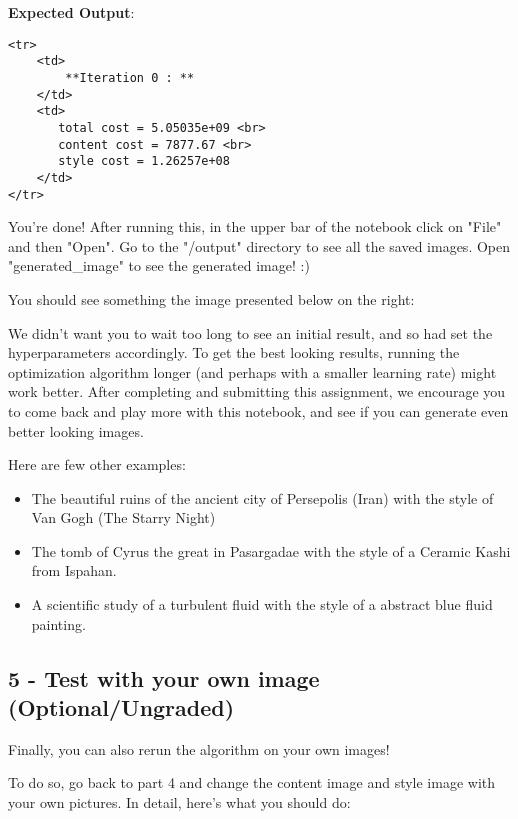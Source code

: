 \documentclass[11pt]{article}
\begin{document}
    \textbf{Expected Output}:

\begin{verbatim}
<tr>
    <td>
        **Iteration 0 : **
    </td>
    <td>
       total cost = 5.05035e+09 <br>
       content cost = 7877.67 <br>
       style cost = 1.26257e+08
    </td>
</tr>
\end{verbatim}

    You're done! After running this, in the upper bar of the notebook click
on "File" and then "Open". Go to the "/output" directory to see all the
saved images. Open "generated\_image" to see the generated image! :)

You should see something the image presented below on the right:

We didn't want you to wait too long to see an initial result, and so had
set the hyperparameters accordingly. To get the best looking results,
running the optimization algorithm longer (and perhaps with a smaller
learning rate) might work better. After completing and submitting this
assignment, we encourage you to come back and play more with this
notebook, and see if you can generate even better looking images.

    Here are few other examples:

\begin{itemize}
\item
  The beautiful ruins of the ancient city of Persepolis (Iran) with the
  style of Van Gogh (The Starry Night) 
\item
  The tomb of Cyrus the great in Pasargadae with the style of a Ceramic
  Kashi from Ispahan. 
\item
  A scientific study of a turbulent fluid with the style of a abstract
  blue fluid painting. 
\end{itemize}

    \subsection{5 - Test with your own image
(Optional/Ungraded)}\label{test-with-your-own-image-optionalungraded}

    Finally, you can also rerun the algorithm on your own images!

To do so, go back to part 4 and change the content image and style image
with your own pictures. In detail, here's what you should do:
\end{document}
